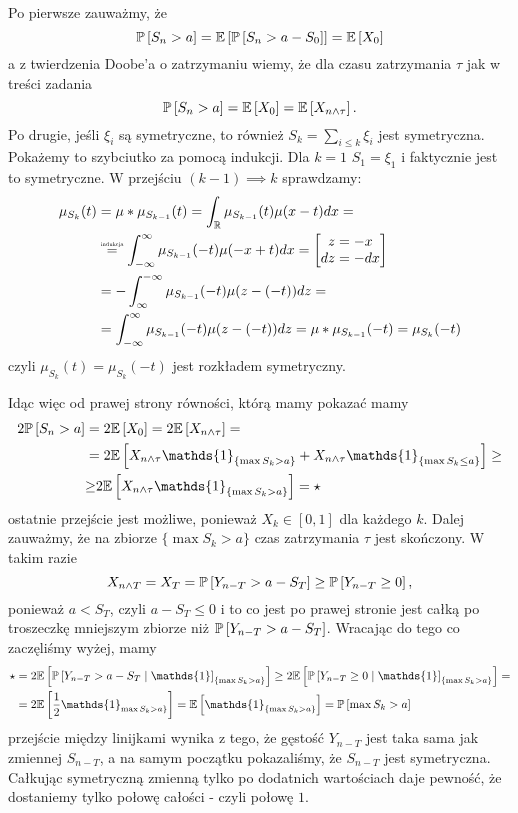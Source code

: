 \documentclass{article}
\begin{document}
Po pierwsze zauważmy, że 
$$\prob{S_n>a}=\expected{\prob{S_n>a-S_0}}=\expected{X_0}$$
a z twierdzenia Doobe'a o zatrzymaniu wiemy, że dla czasu zatrzymania $\tau$ jak w treści zadania
$$\prob{S_n>a}=\expected{X_0}=\expected{X_{n\land \tau}}.$$
Po drugie, jeśli $\xi_i$ są symetryczne, to również $S_k=\sum_{i\leq k}\xi_i$ jest symetryczna. Pokażemy to szybciutko za pomocą indukcji. Dla $k=1$ $S_1=\xi_1$ i faktycznie jest to symetryczne. W przejściu $(k-1)\implies k$ sprawdzamy:
\begin{align*}
  \mu_{S_k}(t)&=\mu\ast\mu_{S_{k-1}}(t)=\int_{\R}\mu_{S_{k-1}}(t)\mu(x-t)dx=\\ 
              &\overset{\text{\scalebox{0.55}{indukcja}}}{=}\int_{-\infty}^\infty\mu_{S_{k-1}}(-t)\mu(-x+t)dx=\begin{bmatrix}z=-x\\dz=-dx\end{bmatrix}\\ 
              &=-\int^{-\infty}_\infty\mu_{S_{k-1}}(-t)\mu(z-(-t))dz=\\
              &=\int_{-\infty}^\infty\mu_{S_{k-1}}(-t)\mu(z-(-t))dz=\mu\ast\mu_{S_{k-1}}(-t)=\mu_{S_k}(-t)
\end{align*}
czyli $\mu_{S_k}(t)=\mu_{S_k}(-t)$ jest rozkładem symetryczny.

Idąc więc od prawej strony równości, którą mamy pokazać mamy
\begin{align*}
  2\prob{S_n>a}&=2\expected{X_0}=2\expected{X_{n\land \tau}}=\\ 
               &=2\expected{X_{n\land\tau}\mathds{1}_{\{\max S_k>a\}}+X_{n\land\tau}\mathds{1}_{\{\max S_k\leq a\}}}\geq\\ 
               &{\geq}2\expected{X_{n\land\tau}\mathds{1}_{\{\max S_k>a\}}}=\star
\end{align*}
ostatnie przejście jest możliwe, ponieważ $X_k\in[0,1]$ dla każdego $k$. Dalej zauważmy, że na zbiorze $\{\max S_k>a\}$ czas zatrzymania $\tau$ jest skończony. W takim razie 
$$X_{n\land T}=X_T=\prob{Y_{n-T}>a-S_T}\geq\prob{Y_{n-T}\geq 0},$$
ponieważ $a<S_T$, czyli $a-S_T\leq 0$ i to co jest po prawej stronie jest całką po troszeczkę mniejszym zbiorze niż $\prob{Y_{n-T}>a-S_T}$. Wracając do tego co zaczęliśmy wyżej, mamy 
\begin{align*}
  \star &=2\expected{\prob{Y_{n-T}>a-S_T}\mathds{1}_{\{\max S_k>a\}}}\geq 2\expected{\prob{Y_{n-T}\geq 0}\mathds{1}_{\{\max S_k>a\}}}=\\ 
        &=2\expected{\frac{1}{2}\mathds{1}_{\max S_k>a\}}}=\expected{\mathds{1}_{\{\max S_k>a\}}}=\prob{\max S_k>a}
\end{align*}
przejście między linijkami wynika z tego, że gęstość $Y_{n-T}$ jest taka sama jak zmiennej $S_{n-T}$, a na samym początku pokazaliśmy, że $S_{n-T}$ jest symetryczna. Całkując symetryczną zmienną tylko po dodatnich wartościach daje pewność, że dostaniemy tylko połowę całości - czyli połowę $1$.
\end{document}
